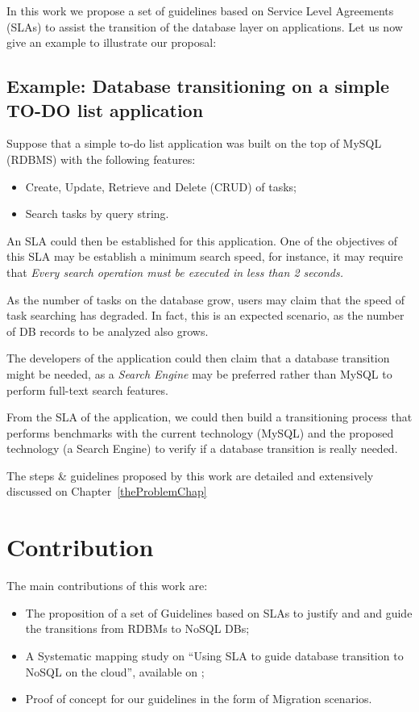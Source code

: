 In this work we propose a set of guidelines based on Service Level Agreements (SLAs) to assist the transition of the database layer on applications. Let us now give an example to illustrate our proposal:

\subsection{Example: Database transitioning on a simple TO-DO list application}

Suppose that a simple to-do list application was built on the top of MySQL (RDBMS) with the following features:

\begin{itemize}
   \item{Create, Update, Retrieve and Delete (CRUD) of tasks;}
   \item{Search tasks by query string.}
\end{itemize}

An SLA could then be established for this application. One of the objectives of this SLA may be establish a minimum search speed, for instance, it may require that \textit{Every search operation must be executed in less than 2 seconds.}

As the number of tasks on the database grow, users may claim that the speed of task searching has degraded. In fact, this is an expected scenario, as the number of DB records to be analyzed also grows.

The developers of the application could then claim that a database transition might be needed, as a \textit{Search Engine} may be preferred rather than MySQL to perform full-text search features. 

From the SLA of the application, we could then build a transitioning process that performs benchmarks with the current technology (MySQL) and the proposed technology (a Search Engine) to verify if a database transition is really needed.

The steps \& guidelines proposed by this work are detailed and extensively discussed on Chapter~\ref{theProblemChap}

\section{Contribution}

The main contributions of this work are: 

\begin{itemize}
   \item{The proposition of a set of Guidelines based on SLAs to justify and and guide the transitions from RDBMs to NoSQL DBs;}
   \item{A Systematic mapping study on ``Using SLA to guide database transition to NoSQL on the cloud'', available on \cite{fabioMartinSM};}
   \item{Proof of concept for our guidelines in the form of Migration scenarios.}
\end{itemize}

